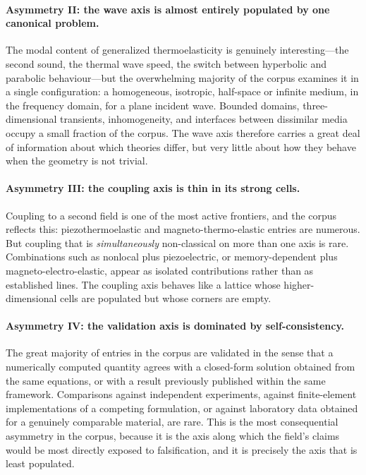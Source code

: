 \paragraph{Asymmetry II: the wave axis is almost entirely populated by one canonical problem.}
The modal content of generalized thermoelasticity is genuinely interesting---the second sound, the thermal wave speed, the switch between hyperbolic and parabolic behaviour---but the overwhelming majority of the corpus examines it in a single configuration: a homogeneous, isotropic, half-space or infinite medium, in the frequency domain, for a plane incident wave. Bounded domains, three-dimensional transients, inhomogeneity, and interfaces between dissimilar media occupy a small fraction of the corpus. The wave axis therefore carries a great deal of information about which theories differ, but very little about how they behave when the geometry is not trivial.

\paragraph{Asymmetry III: the coupling axis is thin in its strong cells.}
Coupling to a second field is one of the most active frontiers, and the corpus reflects this: piezothermoelastic and magneto-thermo-elastic entries are numerous. But coupling that is \emph{simultaneously} non-classical on more than one axis is rare. Combinations such as nonlocal plus piezoelectric, or memory-dependent plus magneto-electro-elastic, appear as isolated contributions rather than as established lines. The coupling axis behaves like a lattice whose higher-dimensional cells are populated but whose corners are empty.

\paragraph{Asymmetry IV: the validation axis is dominated by self-consistency.}
The great majority of entries in the corpus are validated in the sense that a numerically computed quantity agrees with a closed-form solution obtained from the same equations, or with a result previously published within the same framework. Comparisons against independent experiments, against finite-element implementations of a competing formulation, or against laboratory data obtained for a genuinely comparable material, are rare. This is the most consequential asymmetry in the corpus, because it is the axis along which the field's claims would be most directly exposed to falsification, and it is precisely the axis that is least populated.

